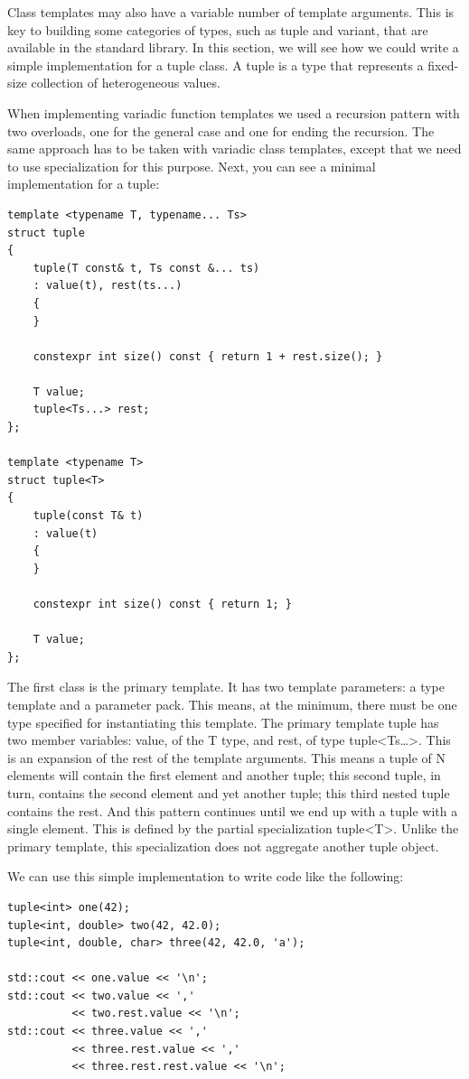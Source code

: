 Class templates may also have a variable number of template arguments. This is key to building some categories of types, such as tuple and variant, that are available in the standard library. In this section, we will see how we could write a simple implementation for a tuple class. A tuple is a type that represents a fixed-size collection of heterogeneous values.

When implementing variadic function templates we used a recursion pattern with two overloads, one for the general case and one for ending the recursion. The same approach has to be taken with variadic class templates, except that we need to use specialization for this purpose. Next, you can see a minimal implementation for a tuple:

\begin{lstlisting}[style=styleCXX]
template <typename T, typename... Ts>
struct tuple
{
	tuple(T const& t, Ts const &... ts)
	: value(t), rest(ts...)
	{
	}

	constexpr int size() const { return 1 + rest.size(); }
	
	T value;
	tuple<Ts...> rest;
};

template <typename T>
struct tuple<T>
{
	tuple(const T& t)
	: value(t)
	{
	}

	constexpr int size() const { return 1; }
	
	T value;
};
\end{lstlisting}

The first class is the primary template. It has two template parameters: a type template and a parameter pack. This means, at the minimum, there must be one type specified for instantiating this template. The primary template tuple has two member variables: value, of the T type, and rest, of type tuple<Ts…>. This is an expansion of the rest of the template arguments. This means a tuple of N elements will contain the first element and another tuple; this second tuple, in turn, contains the second element and yet another tuple; this third nested tuple contains the rest. And this pattern continues until we end up with a tuple with a single element. This is defined by the partial specialization tuple<T>. Unlike the primary template, this specialization does not aggregate another tuple object.

We can use this simple implementation to write code like the following:

\begin{lstlisting}[style=styleCXX]
tuple<int> one(42);
tuple<int, double> two(42, 42.0);
tuple<int, double, char> three(42, 42.0, 'a');

std::cout << one.value << '\n';
std::cout << two.value << ','
          << two.rest.value << '\n';
std::cout << three.value << ','
          << three.rest.value << ','
          << three.rest.rest.value << '\n';
\end{lstlisting}

